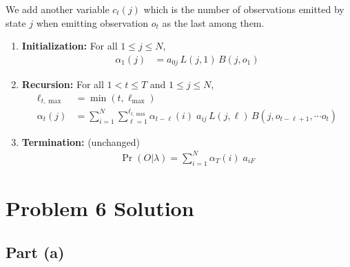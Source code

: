 \documentclass[11pt,a4paper,titlepage]{article}
\begin{document}
We add another variable $c_t(j)$ which is the number of observations emitted by
state $j$ when emitting observation $o_t$ as the last among them.
\begin{enumerate}
    \item \textbf{Initialization:} For all $1 \le j \le N$,
        \begin{align*}
            \alpha_1(j) &= a_{0j} \, L(j, 1) \, B(j, o_1)
        \end{align*}
    \item \textbf{Recursion:} For all $1 < t \le T$ and $1 \le j \le N$,
        \begin{align*}
            \ell_{t, \max} &= \min(t, \ell_{\max}) \\
            \alpha_t(j) &= \sum_{i=1}^N \sum_{\ell=1}^{\ell_{t, \max}} \alpha_{t-\ell}(i) \;
                          a_{ij} \, L(j, \ell) \, B(j, o_{t-\ell+1}, \cdots o_t)
        \end{align*}
    \item \textbf{Termination:} (unchanged)
        \begin{align*}
            \Pr(O|\lambda) = \sum_{i=1}^N \alpha_T(i) \; a_{iF}
        \end{align*}
\end{enumerate}

\section*{Problem 6 Solution}

\subsection*{Part (a)}
\end{document}

